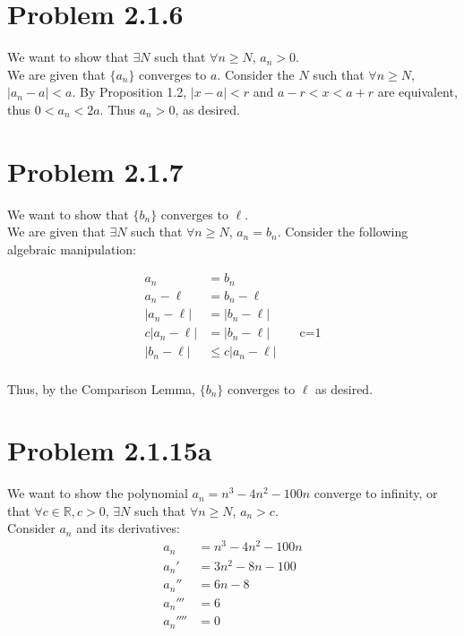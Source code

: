 \documentclass[10pt]{article} %
\begin{document}
\section{Problem 2.1.6}
We want to show that $\exists N$ such that $\forall n \geq N$, $a_n > 0$.\\

We are given that $\{a_n\}$ converges to $a$. Consider the $N$ such that $\forall n \geq N$, $\left|a_n - a\right| < a$. By Proposition 1.2, $\left|x - a\right| < r$ and $a-r < x < a+r$ are equivalent, thus $0 < a_n < 2a$. Thus $a_n > 0$, as desired.\\

\newpage

\section{Problem 2.1.7}
We want to show that $\{b_n\}$ converges to $\ell$.\\

We are given that $\exists N$ such that $\forall n \geq N$, $a_n = b_n$. Consider the following algebraic manipulation:

\begin{align*}
  a_n &= b_n\\
  a_n - \ell &= b_n - \ell\\
  \left|a_n - \ell\right| &= \left|b_n - \ell\right|\\
  c\left|a_n - \ell\right| &= \left|b_n - \ell\right|\hspace{1cm}\mbox{c=1}\\
  \left|b_n - \ell\right| &\leq c\left|a_n - \ell\right|\\
\end{align*}

Thus, by the Comparison Lemma, $\{b_n\}$ converges to $\ell$ as desired.\\

\section{Problem 2.1.15a}
We want to show the polynomial $a_n = n^3 - 4n^2 - 100n$ converge to infinity, or that $\forall c \in \mathbb{R}, c> 0$, $\exists N$ such that $\forall n \geq N$, $a_n > c$.\\

Consider $a_n$ and its derivatives:\\

\begin{align*}
  a_n &= n^3 - 4n^2 - 100n\\
  a_n' &= 3n^2 - 8n - 100\\
  a_n'' &= 6n - 8\\
  a_n''' &= 6\\
  a_n'''' &= 0
\end{align*}
\end{document}
